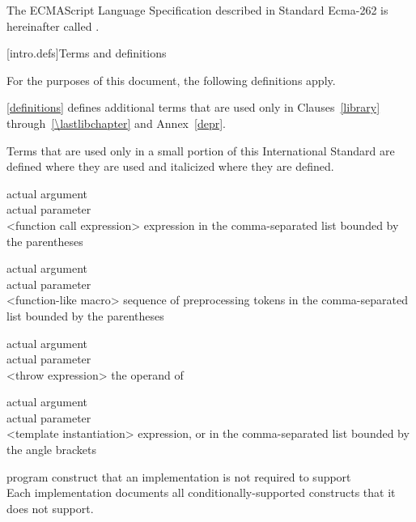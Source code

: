 \pnum
The ECMAScript Language Specification described in Standard Ecma-262 is
hereinafter called .

[intro.defs]{Terms and definitions}

\pnum
{}%
For the purposes of this document, the following definitions apply.

\pnum
\ref{definitions}
defines additional terms that are used only in Clauses~\ref{library}
through~\ref{\lastlibchapter} and Annex~\ref{depr}.

\pnum
Terms that are used only in a small portion of this International
Standard are defined where they are used and italicized where they are
defined.

%
actual argument\\
actual parameter\\
<function call expression> expression in the comma-separated list bounded by the parentheses

%
%
actual argument\\
actual parameter\\
<function-like macro> sequence of preprocessing tokens in the
comma-separated list bounded by the parentheses

%
%
actual argument\\
actual parameter\\
<throw expression> the operand of 

%
%
actual argument\\
actual parameter\\
<template instantiation>
expression,
  or  in the comma-separated
list bounded by the angle brackets

%
program construct that an implementation is not required to support\\
\enternote Each implementation documents all conditionally-supported
constructs that it does not support.\exitnote

